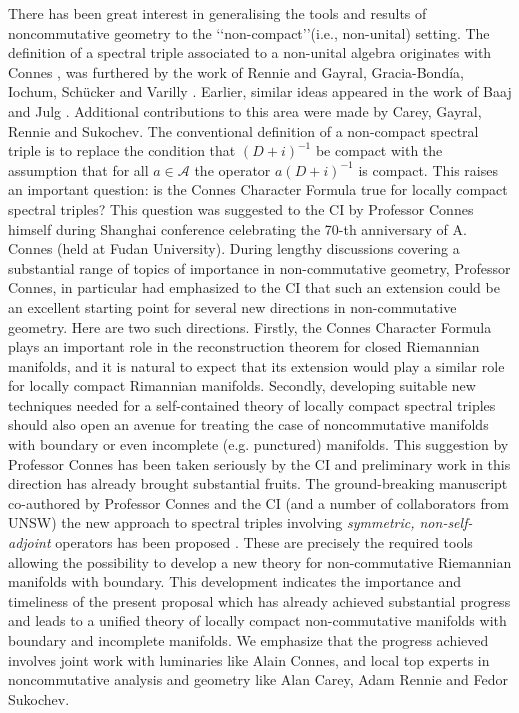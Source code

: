 \documentclass[12pt]{article}
\begin{document}
There has been great interest in generalising the tools and results of noncommutative geometry to the \lq\lq non-compact\rq\rq (i.e., non-unital) setting. The definition of a spectral triple associated to a non-unital algebra originates with Connes \cite{Connes-reality}, was furthered by the work of Rennie \cite{Rennie} and Gayral, Gracia-Bond\'ia, Iochum, Sch\"ucker and Varilly \cite{gayral-moyal}. Earlier, similar ideas appeared in the work of Baaj and Julg \cite{Baaj-Julg}. Additional contributions to this area were made by Carey, Gayral, Rennie and Sukochev\cite{CGRS}. The conventional definition  of a non-compact spectral triple is to replace the condition that $(D+i)^{-1}$ be compact with the assumption that for all $a \in \mathcal{A}$ the operator $a(D+i)^{-1}$ is compact. This raises an important question: is the Connes Character Formula true for locally compact spectral triples? This question was suggested to the CI by Professor Connes himself during Shanghai conference celebrating the 70-th anniversary of A. Connes (held at Fudan University). During lengthy discussions covering a substantial range of topics of importance in non-commutative geometry, Professor Connes, in particular had emphasized to the CI that such an extension could be an excellent starting point for several new directions in non-commutative geometry. Here are two such directions. Firstly, the Connes Character Formula plays  an important role in the reconstruction theorem for closed Riemannian manifolds, and it is natural to expect that its extension would play a similar role for locally compact Rimannian manifolds. Secondly, developing suitable new techniques needed for a self-contained theory of locally compact spectral triples should also open an avenue for treating the case of noncommutative manifolds with boundary or even incomplete (e.g. punctured) manifolds. This suggestion by Professor Connes has been taken seriously by the CI and preliminary work in this direction has already brought substantial fruits. The ground-breaking manuscript co-authored by Professor Connes and the CI (and a number of collaborators from UNSW) the new approach to spectral triples involving {\it symmetric, non-self-adjoint} operators has been proposed \cite{Connes_team_symmetric}. These are precisely the required tools allowing the possibility to develop a new theory for non-commutative Riemannian manifolds with boundary. This development indicates the importance and timeliness of the present proposal which has already achieved substantial progress and leads to a unified theory of locally compact non-commutative manifolds with boundary and incomplete manifolds. We emphasize that the progress achieved involves joint work with luminaries like Alain Connes, and local top experts in noncommutative analysis and geometry like Alan Carey, Adam Rennie and Fedor Sukochev.
    
\end{document}
